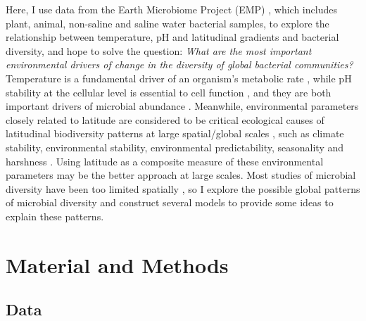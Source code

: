 \documentclass[11pt, a4paper]{article}
\begin{document}
\begin{spacing}{1.5}
Here, I use data from the Earth Microbiome Project (EMP) \citep{thompson2017communal}, which includes plant, animal, non-saline and saline water bacterial samples, to explore the relationship between temperature, pH and latitudinal gradients and bacterial diversity, and hope to solve the question: \textit{What are the most important environmental drivers of change in the diversity of global bacterial communities?} Temperature is a fundamental driver of an organism's metabolic rate \citep{brown2004toward}, while pH stability at the cellular level is essential to cell function \citep{melzner2009physiological}, and they are both important drivers of microbial abundance \citep{cavicchioli2019scientists}. Meanwhile, environmental parameters closely related to latitude are considered to be critical ecological causes of latitudinal biodiversity patterns at large spatial/global scales \citep{mittelbach2007evolution, willig2013latitudinal}, such as climate stability, environmental stability, environmental predictability, seasonality and harshness \citep{kaufman1998structure, willig2013latitudinal}. Using latitude as a composite measure of these environmental parameters may be the better approach at large scales. Most studies of microbial diversity have been too limited spatially \citep{hanson2012beyond, martiny2006microbial, ramette2007biogeography, thompson2017communal}, so I explore the possible global patterns of microbial diversity and construct several models to provide some ideas to explain these patterns. 

\section{Material and Methods}

\subsection{Data}


\end{spacing}
\end{document}
